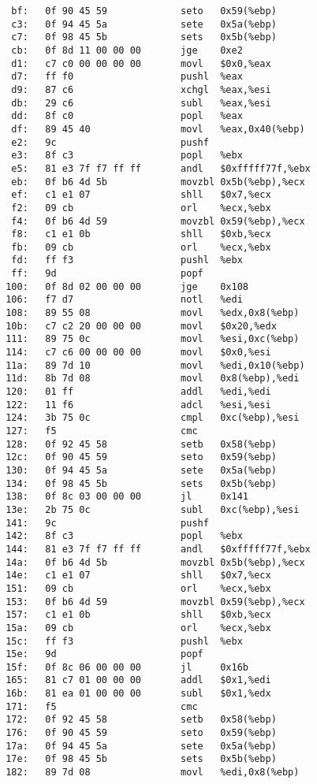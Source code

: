 \begin{verbatim}
  bf:	0f 90 45 59          	seto   0x59(%ebp)
  c3:	0f 94 45 5a          	sete   0x5a(%ebp)
  c7:	0f 98 45 5b          	sets   0x5b(%ebp)
  cb:	0f 8d 11 00 00 00    	jge    0xe2
  d1:	c7 c0 00 00 00 00    	movl   $0x0,%eax
  d7:	ff f0                	pushl  %eax
  d9:	87 c6                	xchgl  %eax,%esi
  db:	29 c6                	subl   %eax,%esi
  dd:	8f c0                	popl   %eax
  df:	89 45 40             	movl   %eax,0x40(%ebp)
  e2:	9c                   	pushf  
  e3:	8f c3                	popl   %ebx
  e5:	81 e3 7f f7 ff ff    	andl   $0xfffff77f,%ebx
  eb:	0f b6 4d 5b          	movzbl 0x5b(%ebp),%ecx
  ef:	c1 e1 07             	shll   $0x7,%ecx
  f2:	09 cb                	orl    %ecx,%ebx
  f4:	0f b6 4d 59          	movzbl 0x59(%ebp),%ecx
  f8:	c1 e1 0b             	shll   $0xb,%ecx
  fb:	09 cb                	orl    %ecx,%ebx
  fd:	ff f3                	pushl  %ebx
  ff:	9d                   	popf   
 100:	0f 8d 02 00 00 00    	jge    0x108
 106:	f7 d7                	notl   %edi
 108:	89 55 08             	movl   %edx,0x8(%ebp)
 10b:	c7 c2 20 00 00 00    	movl   $0x20,%edx
 111:	89 75 0c             	movl   %esi,0xc(%ebp)
 114:	c7 c6 00 00 00 00    	movl   $0x0,%esi
 11a:	89 7d 10             	movl   %edi,0x10(%ebp)
 11d:	8b 7d 08             	movl   0x8(%ebp),%edi
 120:	01 ff                	addl   %edi,%edi
 122:	11 f6                	adcl   %esi,%esi
 124:	3b 75 0c             	cmpl   0xc(%ebp),%esi
 127:	f5                   	cmc    
 128:	0f 92 45 58          	setb   0x58(%ebp)
 12c:	0f 90 45 59          	seto   0x59(%ebp)
 130:	0f 94 45 5a          	sete   0x5a(%ebp)
 134:	0f 98 45 5b          	sets   0x5b(%ebp)
 138:	0f 8c 03 00 00 00    	jl     0x141
 13e:	2b 75 0c             	subl   0xc(%ebp),%esi
 141:	9c                   	pushf  
 142:	8f c3                	popl   %ebx
 144:	81 e3 7f f7 ff ff    	andl   $0xfffff77f,%ebx
 14a:	0f b6 4d 5b          	movzbl 0x5b(%ebp),%ecx
 14e:	c1 e1 07             	shll   $0x7,%ecx
 151:	09 cb                	orl    %ecx,%ebx
 153:	0f b6 4d 59          	movzbl 0x59(%ebp),%ecx
 157:	c1 e1 0b             	shll   $0xb,%ecx
 15a:	09 cb                	orl    %ecx,%ebx
 15c:	ff f3                	pushl  %ebx
 15e:	9d                   	popf   
 15f:	0f 8c 06 00 00 00    	jl     0x16b
 165:	81 c7 01 00 00 00    	addl   $0x1,%edi
 16b:	81 ea 01 00 00 00    	subl   $0x1,%edx
 171:	f5                   	cmc    
 172:	0f 92 45 58          	setb   0x58(%ebp)
 176:	0f 90 45 59          	seto   0x59(%ebp)
 17a:	0f 94 45 5a          	sete   0x5a(%ebp)
 17e:	0f 98 45 5b          	sets   0x5b(%ebp)
 182:	89 7d 08             	movl   %edi,0x8(%ebp)

\end{verbatim}
